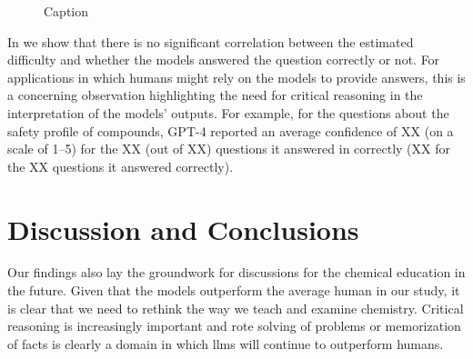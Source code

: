 \documentclass[11pt, oneside]{article}
\begin{document}
\begin{figure}
    \centering
    \caption{Caption}
    \label{fig:estimated_difficulty}
\end{figure}

In  we show that there is no significant correlation between the estimated difficulty and whether the models answered the question correctly or not.
For applications in which humans might rely on the models to provide answers, this is a concerning observation highlighting the need for critical reasoning in the interpretation of the models' outputs.\cite{Li_2023}
For example, for the questions about the safety profile of compounds, GPT-4 reported an average confidence of XX (on a scale of 1--5) for the XX (out of XX) questions it answered in correctly (XX for the XX questions it answered correctly).

\section{Discussion and Conclusions}
Our findings also lay the groundwork for discussions for the chemical education in the future. 
Given that the models outperform the average human in our study, it is clear that we need to rethink the way we teach and examine chemistry.
Critical reasoning is increasingly important and rote solving of problems or memorization of facts is clearly a domain in which \glspl{llm} will continue to outperform humans.






\end{document}
